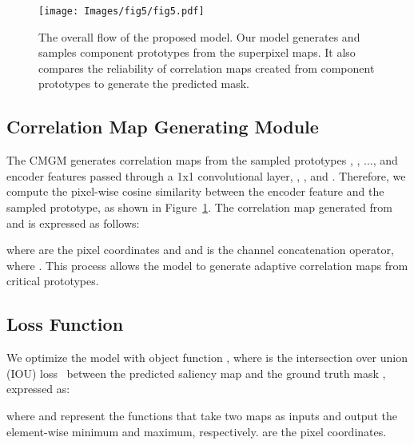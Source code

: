\documentclass[10pt,twocolumn,letterpaper]{article}
\begin{document}
\begin{figure}[t]
	\setlength{\belowcaptionskip}{-24pt}
	\begin{center}
		\texttt{[image: Images/fig5/fig5.pdf]}
		\caption{The overall flow of the proposed model. Our model generates and samples component prototypes from the superpixel maps. It also compares the reliability of correlation maps created from component prototypes to generate the predicted mask.}
		\label{fig:CMGM}
	\end{center}
\end{figure}

\subsection{Correlation Map Generating Module}
The CMGM generates correlation maps from the sampled prototypes , , ...,  and encoder features passed through a 1x1 convolutional layer, , , and . Therefore, we compute the pixel-wise cosine similarity between the encoder feature and the sampled prototype, as shown in Figure~\ref{fig:CMGM}. The correlation map  generated from  and  is expressed as follows:



\noindent
where  are the pixel coordinates and  and  is the channel concatenation operator, where . This process allows the model to generate adaptive correlation maps from critical prototypes.

\subsection{Loss Function}
We optimize the model with object function , where  is the intersection over union (IOU) loss~\cite{lin2019agss} between the predicted saliency map  and the ground truth mask , expressed as:



\noindent
where  and  represent the functions that take two maps as inputs and output the element-wise minimum and maximum, respectively.  are the pixel coordinates.
\end{document}
